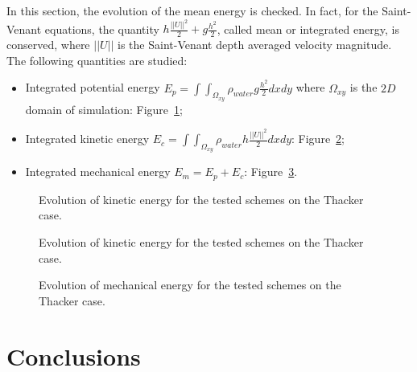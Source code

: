 In this section, the evolution of the mean energy is checked. In fact, for the Saint-Venant equations,
the quantity $h \frac{||U||^2}{2} + g \frac{h^2}{2}$, called mean or integrated energy, is conserved,
where $||U||$ is the Saint-Venant depth averaged velocity magnitude.
The following quantities are studied:
\begin{itemize}
\item Integrated potential energy \textbf{$E_p =\int\int_{\Omega_{xy}}\rho_{water} g \frac{h^2}{2} dxdy$} where $\Omega_{xy}$ is the $2D$ domain of simulation: Figure~\ref{fig:stoker:Ep};
\item Integrated kinetic energy \textbf{$E_c =\int\int_{\Omega_{xy}} \rho_{water} h \frac{||U||^2}{2} dxdy$}: Figure~\ref{fig:stoker:Ec};
\item Integrated mechanical energy \textbf{$E_m = E_p + E_c$}: Figure~\ref{fig:stoker:Em}.
\end{itemize}

\begin{figure}[H]
\centering
  \caption{Evolution of kinetic energy for the tested schemes on the Thacker case.}
\label{fig:stoker:Ep}
\end{figure}

\begin{figure}[H]
\centering
  \caption{Evolution of kinetic energy for the tested schemes on the Thacker case.}
\label{fig:stoker:Ec}
\end{figure}

\begin{figure}[H]
\centering
  \caption{Evolution of mechanical energy for the tested schemes on the Thacker case.}
\label{fig:stoker:Em}
\end{figure}

\section{ Conclusions}

